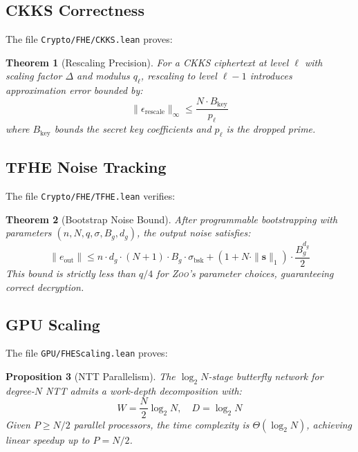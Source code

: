 \documentclass[11pt,letterpaper]{article}
\newtheorem{theorem}{Theorem}
\newtheorem{proposition}[theorem]{Proposition}
\theoremstyle{definition}
\theoremstyle{remark}
\newcommand{\Zoo}{\textsc{Zoo}}
\newcommand{\CKKS}{\textsc{CKKS}}
\begin{document}
\subsection{CKKS Correctness}

The file \texttt{Crypto/FHE/CKKS.lean} proves:

\begin{theorem}[Rescaling Precision]
For a \CKKS{} ciphertext at level $\ell$ with scaling factor $\Delta$ and modulus $q_\ell$, rescaling to level $\ell - 1$ introduces approximation error bounded by:
\begin{equation}
  \|\epsilon_{\mathrm{rescale}}\|_\infty \leq \frac{N \cdot B_{\mathrm{key}}}{p_\ell}
\end{equation}
where $B_{\mathrm{key}}$ bounds the secret key coefficients and $p_\ell$ is the dropped prime.
\end{theorem}

\subsection{TFHE Noise Tracking}

The file \texttt{Crypto/FHE/TFHE.lean} verifies:

\begin{theorem}[Bootstrap Noise Bound]
After programmable bootstrapping with parameters $(n, N, q, \sigma, B_g, d_g)$, the output noise satisfies:
\begin{equation}
  \|e_{\mathrm{out}}\| \leq n \cdot d_g \cdot (N+1) \cdot B_g \cdot \sigma_{\mathrm{bsk}} + (1 + N \cdot \|\mathbf{s}\|_1) \cdot \frac{B_g^{d_g}}{2}
\end{equation}
This bound is strictly less than $q/4$ for \Zoo{}'s parameter choices, guaranteeing correct decryption.
\end{theorem}

\subsection{GPU Scaling}

The file \texttt{GPU/FHEScaling.lean} proves:

\begin{proposition}[NTT Parallelism]
The $\log_2 N$-stage butterfly network for degree-$N$ NTT admits a work-depth decomposition with:
\begin{equation}
  W = \frac{N}{2} \log_2 N, \quad D = \log_2 N
\end{equation}
Given $P \geq N/2$ parallel processors, the time complexity is $\Theta(\log_2 N)$, achieving linear speedup up to $P = N/2$.
\end{proposition}
\end{document}
